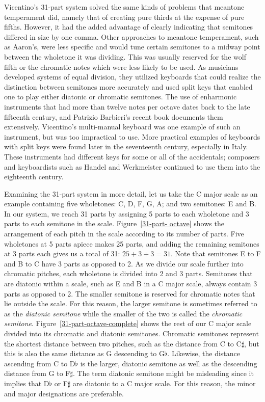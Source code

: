 Vicentino's 31-part system solved the same kinds of problems that meantone temperament
did, namely that of creating pure thirds at the expense of pure fifths. However, it had
the added advantage of clearly indicating that semitones differed in size by one comma.
Other approaches to meantone temperament, such as Aaron's, were less specific and would
tune certain semitones to a midway point between the wholetone it was dividing.  This
was usually reserved for the wolf fifth or the chromatic notes which were less likely
to be used.  As musicians developed systems of equal division, they utilized keyboards
that could realize the distinction between semitones more accurately and used split
keys that enabled one to play either diatonic or chromatic semitones.  The use of
enharmonic instruments that had more than twelve notes per octave dates back to the
late fifteenth century, and Patrizio Barbieri's recent book documents them
extensively.\autocite{PB:1} Vicentino's multi-manual keyboard was one example of such
an instrument, but was too impractical to use. More practical examples of keyboards
with split keys were found later in the seventeenth century, especially in Italy. These
instruments had different keys for some or all of the accidentals; composers and keyboardists
such as Handel and Werkmeister continued to use them into the eighteenth century.
\autocite[108]{MB:1}

Examining the 31-part system in more detail, let us take the C major scale as an example containing
five wholetones: C, D, F, G, A; and two semitones: E and B. In our system, we reach 31 parts by
assigning 5 parts to each wholetone and 3 parts to each semitone in the scale.  Figure~\ref{31-part-
octave} shows the arrangement of each pitch in the scale according to its number of parts.
 Five wholetones at 5 parts apiece makes 25 parts, and adding
the remaining semitones at 3 parts each gives us a total of 31: $ 25 + 3 + 3 = 31 $. Note that
semitones E to F and B to C have 3 parts as opposed to 2.  As we divide our scale further into
chromatic pitches, each wholetone is divided into 2 and 3 parts.  Semitones that are diatonic within
a scale, such as E and B in a C major scale, always contain 3 parts as opposed to 2. The smaller
semitone is reserved for chromatic notes that lie outside the scale. For this reason, the larger
semitone is sometimes referred to as the \textit{diatonic semitone} while the smaller of the two is
called the \textit{chromatic semitone}. Figure~\ref{31-part-octave-complete} shows the rest of our C
major scale divided into its chromatic and diatonic semitones.  Chromatic semitones represent the shortest distance between two pitches, such as the
distance from C to C$\sharp$, but this is also the same distance as G descending to G$\flat$.
Likewise, the distance ascending from C to D$\flat$ is the larger, diatonic semitone as well as the
descending distance from G to F$\sharp$. The term diatonic semitone might be misleading since it
implies that D$\flat$ or F$\sharp$ are diatonic to a C major scale.  For this reason, the minor and
major designations are preferable.

